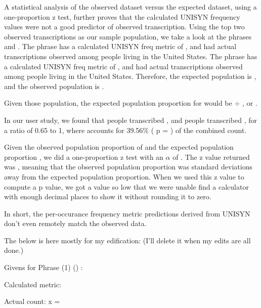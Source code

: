 A statistical analysis of the observed dataset versus the expected dataset, using a one-proportion z test, further proves that the calculated UNISYN frequency values were not a good predictor of observed transcription.   Using the top two observed transcriptions as our sample population, we take a look at the phrases \phraseOne and \phraseTwo.  The phrase \phraseOne has a calculated UNISYN freq metric of \unisynFreqForPhraseOne, and had \USATranscriptionsOfPhraseOne actual transcriptions observed among people living in the United States. The phrase \phraseTwo has a calculated UNISYN freq metric of \unisynFreqForPhraseTwo, and had \USATranscriptionsOfPhraseTwo actual transcriptions observed among people living in the United States. Therefore, the expected population is \unisynCombinedFreq, and the observed population is \USACombinedTranscriptions.  

Given those population, the expected population proportion for \phraseOne would be \unisynFreqForPhraseOne  $\div$ \unisynCombinedFreq, or \expectedProportionOfPhraseOneOccurances.  

In our user study, we found that \USATranscriptionsOfPhraseOne people transcribed \phraseOne, and \USATranscriptionsOfPhraseTwo people transcribed \phraseTwo, for a ratio of 0.65 to 1, where \phraseOne accounts for 39.56\% ( p = \observedProportionOfPhraseOneOccurances ) of the combined count. 

Given the observed population proportion of \observedProportionOfPhraseOneOccurances and the expected population proportion \expectedProportionOfPhraseOneOccurances, we did a one-proportion z test with an $\alpha$ of \alphaSigFigs.  The z value returned was \UNISYNzVal, meaning that the observed population proportion was \UNISYNzVal standard deviations away from the expected population proportion.  When we used this z value to compute a p value, we got a value so low that we were unable find a calculator with enough decimal places to show it without rounding it to zero.

In short, the per-occurance frequency metric predictions derived from UNISYN don't even remotely match the observed data.


The below is here mostly for my edification: (I'll delete it when my edits are all done.)

Givens for Phrase (1) (\phraseOne) :

Calculated metric: \unisynFreqForPhraseOne

Actual count: x = \USATranscriptionsOfPhraseOne


